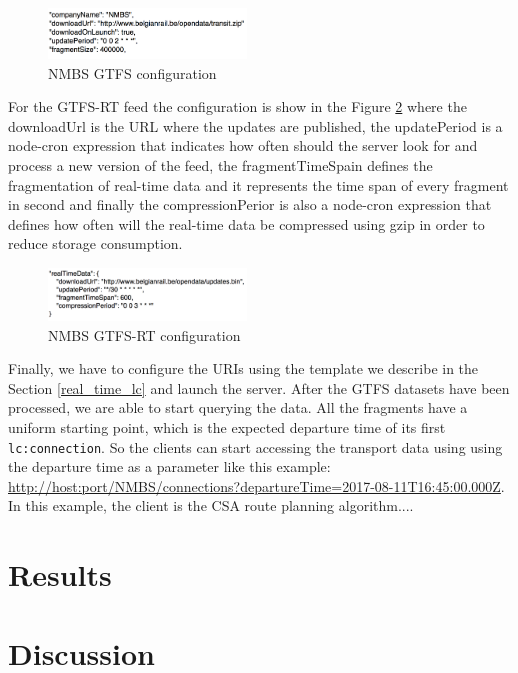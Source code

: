 \documentclass[sw]{iosart2x}
\begin{document}
\begin{figure}[t]
	\includegraphics[width=0.47\textwidth]{images/nmbs_server.png}
	\caption{NMBS GTFS configuration}\label{fig:nmbs_server}
\end{figure}

For the GTFS-RT feed the configuration is show in the Figure \ref{fig:nmbs_rt_server} where the downloadUrl is the URL where the updates are published, the updatePeriod is a node-cron expression that indicates  how often should the server look for and process a new version of the feed, the fragmentTimeSpain defines the fragmentation of real-time data and it represents the time span of every fragment in second and finally the compressionPerior is also a node-cron expression that defines how often will the real-time data be compressed using gzip in order to reduce storage consumption.

\begin{figure}[t]
	\includegraphics[width=0.47\textwidth]{images/nmbs_rt_server.png}
	\caption{NMBS GTFS-RT configuration}\label{fig:nmbs_rt_server}
\end{figure}

Finally, we have to configure the URIs using the template we describe in the Section \ref{real_time_lc} and launch the server. After the GTFS datasets have been processed, we are able to start querying the data. All the fragments have a uniform starting point, which is the expected departure time of its first \texttt{lc:connection}. So the clients can start accessing the transport data using using the departure time as a parameter like this example: \url{http://host:port/NMBS/connections?departureTime=2017-08-11T16:45:00.000Z}. In this example, the client is the CSA route planning algorithm....%


\section{Results} %




\section{Discussion} %
\end{document}
